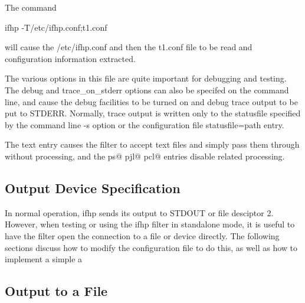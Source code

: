 \documentclass[a4paper]{article}
\begin{document}
The command
\begin{tscreen}
ifhp -T/etc/ifhp.conf;t1.conf
\end{tscreen}

will cause the
{\ttfamily /etc/ifhp.conf} and then the
{\ttfamily t1.conf} file to be read and configuration information extracted.

The various options in this file are quite important for debugging
and testing.
The
{\ttfamily debug}
and
{\ttfamily trace\_on\_stderr}
options can also be specifed on the command line,
and cause the debug facilities to be turned on and debug trace output
to be put to
{\ttfamily STDERR}.
Normally,
trace output is written only to the
{\ttfamily statusfile}
specified by the command line
{\ttfamily -s} option or the configuration file
{\ttfamily statusfile=path} entry.

The
{\ttfamily text} entry causes the filter to accept text files
and simply pass them through without processing,
and the
{\ttfamily ps@}
{\ttfamily pjl@}
{\ttfamily pcl@}
entries disable related processing.


\subsection{Output Device Specification}

In normal operation,
{\ttfamily ifhp}
sends its output to
{\ttfamily STDOUT} or file desciptor 2.
However,
when testing or using the
{\ttfamily ifhp}
filter in standalone mode,
it is useful to have the filter open the connection
to a file or device directly.
The following sections
discuss how to modify the configuration file to do this,
as well as how to implement a simple
a


\subsection{Output to a File}
\end{document}
